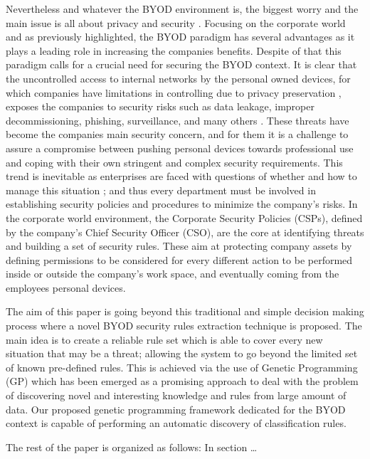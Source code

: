 \documentclass[a4paper,10pt,twocolumn,preprint,3p]{elsarticle}
\begin{document}
Nevertheless and whatever the BYOD environment is, the biggest worry and the main issue is all about privacy and security \cite{miller2012byod}.
Focusing on the corporate world and as previously highlighted, the BYOD paradigm has several advantages
as it plays a leading role in increasing the
companies benefits.  Despite of that this
paradigm calls for a crucial need for securing the BYOD context. It is
clear that the uncontrolled access to internal networks by the
personal owned devices, for which companies have limitations in
controlling due to privacy preservation \cite{miller2012byod}, exposes the companies to security risks such as data
leakage, improper decommissioning, phishing, surveillance, and many
others \cite{lennon2012changing}. These threats have become the
companies main security concern, and for them it is a challenge to
assure a compromise between pushing personal devices towards
professional use and coping with their own stringent and complex
security requirements. This trend is inevitable as enterprises are
faced with questions of whether and how to manage this situation \cite{thomson2012byod}; and
thus every department must be involved in establishing security
policies and procedures to minimize the company's risks. In the
corporate world environment, the Corporate Security Policies (CSPs),
defined by the company's Chief Security Officer (CSO), are the core at
identifying threats and building a set of security rules. These aim at protecting
company assets by defining permissions to be considered for every
different action to be performed inside or outside the company's work
space, and eventually coming from the employees personal devices.

The aim of this paper is going beyond this traditional and simple
decision making process where a novel  BYOD security rules extraction
technique is proposed. The main idea is to create a reliable rule set
which is able to cover every new situation that may be a threat;
allowing the system to go beyond the limited set of known pre-defined
rules. This is achieved via the use of Genetic Programming (GP) which
has been emerged as a promising approach to deal with the problem of
discovering novel and interesting knowledge and rules from large
amount of data. Our proposed genetic programming framework dedicated
for the BYOD context is capable of performing an automatic discovery
of classification rules.

The rest of the paper is organized as follows: In section \ldots
\end{document}
